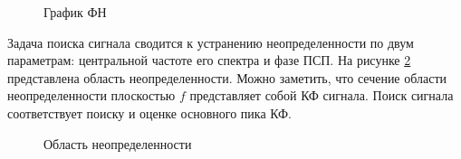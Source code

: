 \begin{figure}[H]
\center{}
\caption{График ФН}
\label{pic:corr_peak}
\end{figure}

Задача поиска сигнала сводится к устранению неопределенности по двум параметрам: центральной частоте его спектра
и фазе ПСП. На рисунке \ref{pic:ambiguity_region} представлена область неопределенности. Можно заметить, что сечение
области неопределенности плоскостью ${f}$ представляет собой КФ сигнала. Поиск сигнала соответствует поиску и
оценке основного пика КФ.

\begin{figure}[H]
\center{}
\caption{Область неопределенности}
\label{pic:ambiguity_region}
\end{figure}

\newpage
